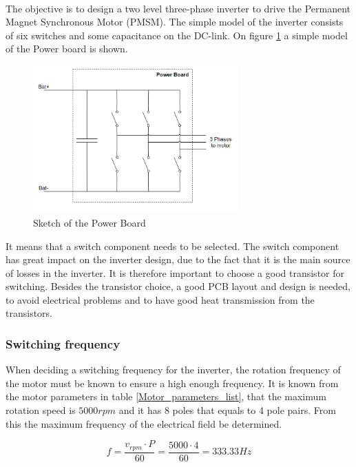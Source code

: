 \\
The objective is to design a two level three-phase inverter to drive the Permanent Magnet Synchronous Motor (PMSM). The simple model of the inverter consists of six switches and some capacitance on the DC-link. On figure \ref{fig:Sketch_PowerBoard} a simple model of the Power board is shown.

    \begin{figure}[H]
		\centering
		\includegraphics[width=0.7\textwidth]{pictures/hardware/Power_Board/Sketch_of_powerBoard.PNG}
		\caption{Sketch of the Power Board}
		\label{fig:Sketch_PowerBoard}
	\end{figure} 
	
It means that a switch component needs to be selected. The switch component has great impact on the inverter design, due to the fact that it is the main source of losses in the inverter. It is therefore important to choose a good transistor for switching. Besides the transistor choice, a good PCB layout and design is needed, to avoid electrical problems and to have good heat transmission from the transistors.

\subsubsection{Switching frequency} \label{switching_frequency}
When deciding a switching frequency for the inverter, the rotation frequency of the motor  must be known  to  ensure  a  high  enough  frequency. 
It is known from the motor parameters in table \ref{Motor_parameters_list}, that the maximum rotation speed  is $5000 rpm$ and it has 8 poles that equals to 4 pole pairs. From this the maximum frequency of the electrical field be determined.

\begin{equation}
    f = \frac{v_{rpm} \cdot P}{60} = \frac{5000 \cdot 4}{60} = 333.33 Hz
    \label{eq:max_frequency}
\end{equation}

